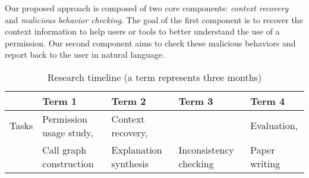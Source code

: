 
Our proposed approach is composed of two core components: \emph{context
    recovery} and \emph{malicious behavior checking}. 
The goal of the first
component is to recover the context information to help users or tools to better understand
the use of a permission. 
Our second component aims to check these
malicious behaviors and report back to the user in natural language.

\begin{table*}[ht!]
    \begin{center}
        \begin{small}
            \begin{tabular}{|l|l|l|l|l|}
                \hline  & Term 1 & Term 2 & Term 3 & Term 4\\
                \hline Tasks & Permission usage study, & Context recovery, &  & Evaluation, \\
                & Call graph construction & Explanation synthesis & Inconsistency checking & Paper writing \\
                \hline
            \end{tabular}
        \end{small}
    \end{center}
    
    \caption{Research timeline (a term represents three months)}
    \label{tbl:plan}
    \vspace*{-5ex}
\end{table*}

